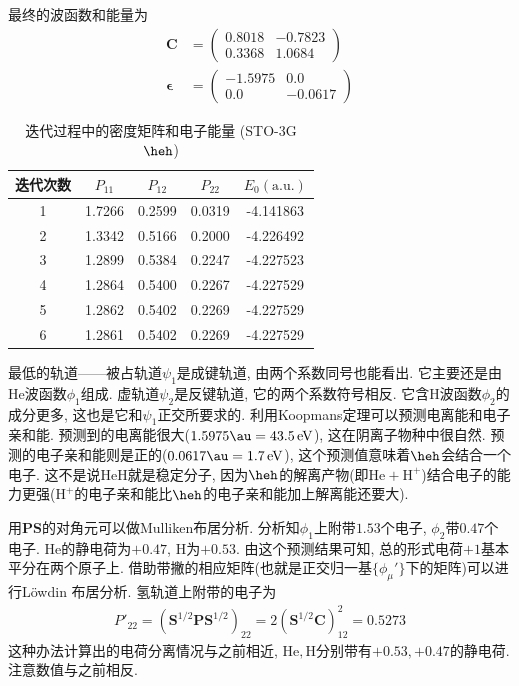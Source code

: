 最终的波函数和能量为
\begin{align}
	\mathbf{C} &= 
	\begin{pmatrix}
		0.8018&-0.7823\\0.3368&1.0684
	\end{pmatrix}\\
	\bm{\epsilon} &= 
	\begin{pmatrix}
		-1.5975&0.0\\0.0&-0.0617
	\end{pmatrix}
\end{align}
\begin{table}[H]
	\centering
	\caption{迭代过程中的密度矩阵和电子能量 (STO-3G $\heh$) }
	\begin{tabular}{ccccc}
		\hline
		迭代次数 & $P_{11}$ & $P_{12}$ & $P_{22}$ & $E_0(\mathrm{a.u.})$ \\ \hline
		1   &  1.7266  &  0.2599  &  0.0319  &      -4.141863       \\
		2   &  1.3342  &  0.5166  &  0.2000  &      -4.226492       \\
		3   &  1.2899  &  0.5384  &  0.2247  &      -4.227523       \\
		4   &  1.2864  &  0.5400  &  0.2267  &      -4.227529       \\
		5   &  1.2862  &  0.5402  &  0.2269  &      -4.227529       \\
		6   &  1.2861  &  0.5402  &  0.2269  &      -4.227529       \\ \hline
	\end{tabular}
	\label{t3.5}
\end{table}
最低的轨道——被占轨道$\psi_1$是成键轨道, 
由两个系数同号也能看出. 
它主要还是由$\mathrm{He}$波函数$\phi_1$组成. 
虚轨道$\psi_2$是反键轨道, 
它的两个系数符号相反. 
它含$\mathrm{H}$波函数$\phi_2$的成分更多, 
这也是它和$\psi_1$正交所要求的. 
利用Koopmans定理可以预测电离能和电子亲和能. 
预测到的电离能很大($1.5975\au=43.5 \,\mathrm{eV}$), 
这在阴离子物种中很自然. 
预测的电子亲和能则是正的($0.0617\au=1.7\,\mathrm{eV}$), 
这个预测值意味着$\heh$会结合一个电子. 
这不是说$\mathrm{HeH}$就是稳定分子, 
因为$\heh$的解离产物(即$\mathrm{He}+\mathrm{H}^+$)结合电子的能力更强($\mathrm{H}^+$的电子亲和能比$\heh$的电子亲和能加上解离能还要大).


用$\mathbf{PS}$的对角元可以做Mulliken布居分析. 
分析知$\phi_1$上附带$1.53$个电子, 
$\phi_2$带$0.47$个电子.
$\mathrm{He}$的静电荷为$+0.47$, 
$\mathrm{H}$为$+0.53$. 
由这个预测结果可知, 
总的形式电荷$+1$基本平分在两个原子上. 
借助带撇的相应矩阵(也就是正交归一基$\{\phi_\mu'\}$下的矩阵)可以进行L\"owdin 布居分析. 
氢轨道上附带的电子为
\begin{align}
	P'_{22} = (\mathbf{S}^{1/2}\mathbf{PS}^{1/2})_{22} = 2(\mathbf{S}^{1/2}\mathbf{C})^2_{12}=0.5273
\end{align}
这种办法计算出的电荷分离情况与之前相近, 
$\mathrm{He,H}$分别带有$+0.53,+0.47$的静电荷. 
注意数值与之前相反.


